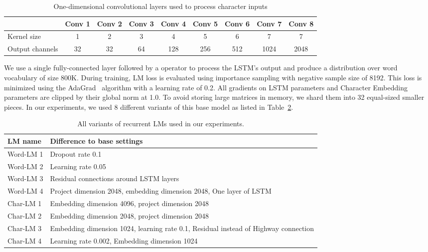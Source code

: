 \documentclass{article}
\begin{document}
\begin{table}[h!]
  \caption{One-dimensional convolutional layers used to process character inputs}
  \label{tab:cnn}
  \centering
  \small
  \begin{tabular}{lcccccccc}
    \toprule
      & Conv 1 & Conv 2 & Conv 3 & Conv 4 & Conv 5 & Conv 6 & Conv 7 & Conv 8 \\
    \midrule
    Kernel size & 1 & 2 & 3 & 4 & 5 & 6 & 7 & 7 \\
    Output channels & 32 & 32 & 64 & 128 & 256 & 512 & 1024 & 2048 \\
    \bottomrule
  \end{tabular}
\end{table}

We use a single fully-connected layer followed by a  operator to process the LSTM's output and produce a distribution over word vocabulary of size 800K. During training, LM loss is evaluated using importance sampling with negative sample size of 8192. This loss is minimized using the AdaGrad~\cite{duchi2011adaptive} algorithm with a learning rate of 0.2. All gradients on LSTM parameters and Character Embedding parameters are clipped by their global norm at 1.0. To avoid storing large matrices in memory, we shard them into 32 equal-sized smaller pieces. In our experiments, we used 8 different variants of this base model as listed in Table~\ref{tab:variants}.

\begin{table}[h!]
  \caption{All variants of recurrent LMs used in our experiments.}
  \label{tab:variants}
  \centering
  \small
  \begin{tabular}{ll}
    \toprule
    LM name  & Difference to base settings \\
    \midrule
    Word-LM 1 & Dropout rate 0.1 \\
    Word-LM 2 & Learning rate 0.05  \\
    Word-LM 3 & Residual connections around LSTM layers  \\
    Word-LM 4 & Project dimension 2048, embedding dimension 2048, One layer of LSTM \\
    Char-LM 1 & Embedding dimension 4096, project dimension 2048 \\
    Char-LM 2 & Embedding dimension 2048, project dimension 2048 \\
    Char-LM 3 & Embedding dimension 1024, learning rate 0.1, Residual instead of Highway connection\\
    Char-LM 4 & Learning rate 0.002, Embedding dimension 1024 \\
    \bottomrule
  \end{tabular}
\end{table}
\end{document}
